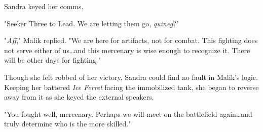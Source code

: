 Sandra keyed her comms. 

"Seeker Three to Lead. We are letting them go, \emph{quineg}?"

"\emph{Aff}," Malik replied.
"We are here for artifacts, not for combat.
This fighting does not serve either of us{\ldots}and this mercenary is wise enough to recognize it.
There will be other days for fighting."

Though she felt robbed of her victory, Sandra could find no fault in Malik's logic.
Keeping her battered \emph{Ice Ferret} facing the immobilized tank, she began to reverse away from it as she keyed the external speakers. 

"You fought well, mercenary.
Perhaps we will meet on the battlefield again{\ldots}and truly determine who is the more skilled."

